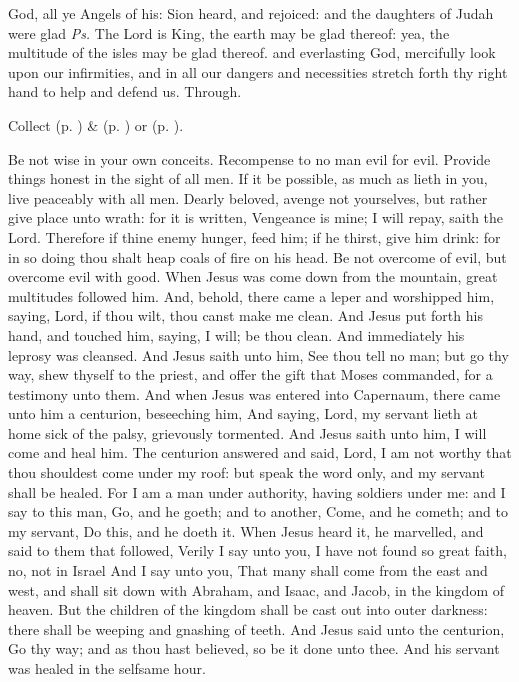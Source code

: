 \introit
{} God, all ye Angels of his: Sion heard, and rejoiced: and the daughters of Judah were glad \textit{Ps.} The Lord is King, the earth may be glad thereof: yea, the multitude of the isles may be glad thereof.
\collect
{} and everlasting God, mercifully look upon our infirmities, and in all our dangers and necessities stretch forth thy right hand to help and defend us. Through.
\begin{rubric}
     Collect  (p. \pageref{SPMaryPostChristmas}) \&   (p. \pageref{SPAgainst}) or  (p. \pageref{SPChiefBishop}).
\end{rubric}
 Be not wise in your own conceits. Recompense to no man evil for evil. Provide things honest in the sight of all men. If it be possible, as much as lieth in you, live peaceably with all men. Dearly beloved, avenge not yourselves, but rather give place unto wrath: for it is written, Vengeance is mine; I will repay, saith the Lord. Therefore if thine enemy hunger, feed him; if he thirst, give him drink: for in so doing thou shalt heap coals of fire on his head. Be not overcome of evil, but overcome evil with good.
 When Jesus was come down from the mountain, great multitudes followed him. And, behold, there came a leper and worshipped him, saying, Lord, if thou wilt, thou canst make me clean. And Jesus put forth his hand, and touched him, saying, I will; be thou clean. And immediately his leprosy was cleansed. And Jesus saith unto him, See thou tell no man; but go thy way, shew thyself to the priest, and offer the gift that Moses commanded, for a testimony unto them. And when Jesus was entered into Capernaum, there came unto him a centurion, beseeching him, And saying, Lord, my servant lieth at home sick of the palsy, grievously tormented. And Jesus saith unto him, I will come and heal him. The centurion answered and said, Lord, I am not worthy that thou shouldest come under my roof: but speak the word only, and my servant shall be healed. For I am a man under authority, having soldiers under me: and I say to this man, Go, and he goeth; and to another, Come, and he cometh; and to my servant, Do this, and he doeth it. When Jesus heard it, he marvelled, and said to them that followed, Verily I say unto you, I have not found so great faith, no, not in Israel And I say unto you, That many shall come from the east and west, and shall sit down with Abraham, and Isaac, and Jacob, in the kingdom of heaven. But the children of the kingdom shall be cast out into outer darkness: there shall be weeping and gnashing of teeth. And Jesus said unto the centurion, Go thy way; and as thou hast believed, so be it done unto thee. And his servant was healed in the selfsame hour.

